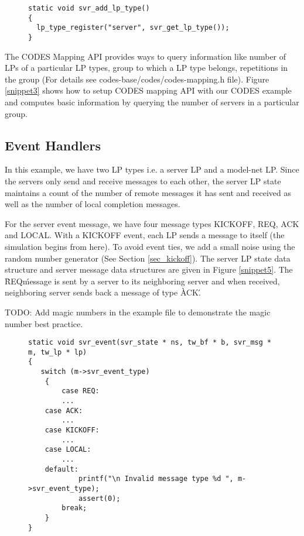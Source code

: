\documentclass[conference,10pt,compsocconf,onecolumn]{IEEEtran}
\begin{document}
\begin{figure}
\begin{lstlisting}[caption=Registering an LP type, label=snippet4]
static void svr_add_lp_type()
{
  lp_type_register("server", svr_get_lp_type());
}
\end{lstlisting}
\end{figure}

The CODES Mapping API provides ways to query information like number of LPs of
a particular LP types, group to which a LP type belongs, repetitions in the
group (For details see codes-base/codes/codes-mapping.h file).  Figure
\ref{snippet3} shows how to setup CODES mapping API with our CODES example and
computes basic information by querying the number of servers in a particular
group. 

\subsection{Event Handlers}
In this example, we have two LP types i.e. a server LP and a model-net LP.
Since the servers only send and receive messages to each other, the server LP state
maintains a count of the number of remote messages it has sent and received as
well as the number of local completion messages.   

For the server event message, we have four message types KICKOFF, REQ, ACK and
LOCAL. With a KICKOFF event, each LP sends a message to itself (the simulation
begins from here).  To avoid event ties, we add a small noise using the random
number generator (See Section \ref{sec_kickoff}). The server LP state data structure
and server message data structures are given in Figure \ref{snippet5}. The \`REQ\'
message is sent by a server to its neighboring server and when received,
neighboring server sends back a message of type \`ACK\'.

TODO: Add magic numbers in the example file to demonstrate the magic number best
practice. 

\begin{figure}
\begin{lstlisting}[caption=Event handler of the server LP type., label=snippet5]
static void svr_event(svr_state * ns, tw_bf * b, svr_msg * m, tw_lp * lp)
{
   switch (m->svr_event_type)
    {
        case REQ:
        ...
	case ACK:
        ...
	case KICKOFF:
        ...
	case LOCAL:
        ...
	default:
            printf("\n Invalid message type %d ", m->svr_event_type);
            assert(0);
        break;
    }
}
\end{lstlisting}
\end{figure}
\end{document}
